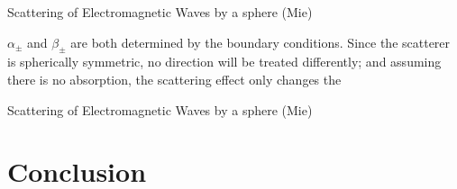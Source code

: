 \documentclass[10pt]{beamer}
\newcommand{\themename}{\textbf{\textsc{metropolis}}\xspace}
\begin{document}

\begin{frame}[fragile]{Scattering of Electromagnetic Waves by a sphere (Mie)}

$\alpha _{\pm}$ and $\beta_{\pm}$ are both determined by the boundary conditions.
Since the scatterer is spherically symmetric, no direction will be treated differently; and assuming there is no absorption, the scattering effect only changes the 

\end{frame}


\begin{frame}[fragile]{Scattering of Electromagnetic Waves by a sphere (Mie)}


\end{frame}








\section{Conclusion}


\appendix
\end{document}
